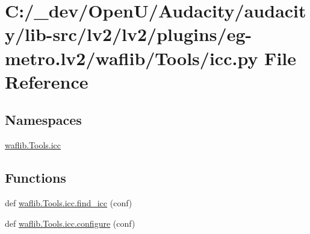 \hypertarget{lv2_2plugins_2eg-metro_8lv2_2waflib_2_tools_2icc_8py}{}\section{C\+:/\+\_\+dev/\+Open\+U/\+Audacity/audacity/lib-\/src/lv2/lv2/plugins/eg-\/metro.lv2/waflib/\+Tools/icc.py File Reference}
\label{lv2_2plugins_2eg-metro_8lv2_2waflib_2_tools_2icc_8py}
\subsection*{Namespaces}
\begin{DoxyCompactItemize}
\item 
 \hyperlink{namespacewaflib_1_1_tools_1_1icc}{waflib.\+Tools.\+icc}
\end{DoxyCompactItemize}
\subsection*{Functions}
\begin{DoxyCompactItemize}
\item 
def \hyperlink{namespacewaflib_1_1_tools_1_1icc_ac87401e53461cf3742295c6ca369977a}{waflib.\+Tools.\+icc.\+find\+\_\+icc} (conf)
\item 
def \hyperlink{namespacewaflib_1_1_tools_1_1icc_a29b371f4c4eaba47d7b198073638bfd9}{waflib.\+Tools.\+icc.\+configure} (conf)
\end{DoxyCompactItemize}
